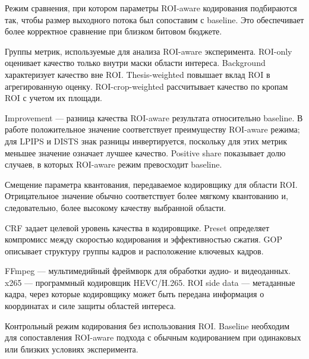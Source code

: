 \documentclass[12pt,a4paper,oneside,openany]{report}
\begin{document}
\begin{description}[style=nextline,leftmargin=1.25cm,labelsep=0.5em]
  \item[\texttt{match\_baseline}]
      Режим сравнения, при котором параметры ROI-aware кодирования подбираются так, чтобы размер
      выходного потока был сопоставим с baseline. Это обеспечивает более корректное сравнение
      при близком битовом бюджете.

  \item[ROI-only, background, thesis-weighted, ROI-crop-weighted]
      Группы метрик, используемые для анализа ROI-aware эксперимента. ROI-only оценивает качество
      только внутри маски области интереса. Background характеризует качество вне ROI.
      Thesis-weighted повышает вклад ROI в агрегированную оценку. ROI-crop-weighted рассчитывает
      качество по кропам ROI с учетом их площади.

  \item[Improvement, positive share]
      Improvement --- разница качества ROI-aware результата относительно baseline. В работе
      положительное значение соответствует преимуществу ROI-aware режима; для LPIPS и DISTS
      знак разницы инвертируется, поскольку для этих метрик меньшее значение означает лучшее
      качество. Positive share показывает долю случаев, в которых ROI-aware режим превосходит
      baseline.

  \item[\texttt{qoffset}]
      Смещение параметра квантования, передаваемое кодировщику для области ROI. Отрицательное
      значение обычно соответствует более мягкому квантованию и, следовательно, более высокому
      качеству выбранной области.

  \item[CRF, preset, GOP]
      CRF задает целевой уровень качества в кодировщике. Preset определяет компромисс между
      скоростью кодирования и эффективностью сжатия. GOP описывает структуру группы кадров и
      расположение ключевых кадров.

  \item[FFmpeg, x265, ROI side data]
      FFmpeg --- мультимедийный фреймворк для обработки аудио- и видеоданных. x265 ---
      программный кодировщик HEVC/H.265. ROI side data --- метаданные кадра, через которые
      кодировщику может быть передана информация о координатах и силе защиты областей интереса.

  \item[Baseline]
      Контрольный режим кодирования без использования ROI. Baseline необходим для сопоставления
      ROI-aware подхода с обычным кодированием при одинаковых или близких условиях эксперимента.


\end{description}
\end{document}
